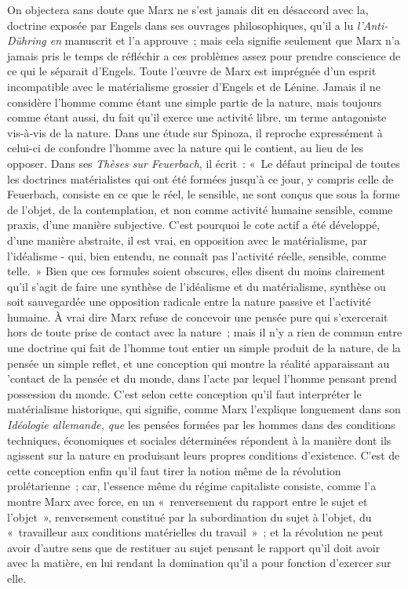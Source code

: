 \documentclass[french,twoside]{book} %
\begin{document}
On objectera sans doute que Marx ne s'est jamais dit en désaccord avec la, doctrine exposée par Engels dans ses ouvrages philosophiques, qu'il a lu {\itshape l'Anti-Dühring en} manuscrit et l'a approuve ; mais cela signifie seulement que Marx n'a jamais pris le temps de réfléchir a ces problèmes assez pour prendre conscience de ce qui le séparait d'Engels. Toute l’œuvre de Marx est imprégnée d'un esprit incompatible avec le matérialisme grossier d'Engels et de Lénine. Jamais il ne considère l'homme comme étant une simple partie de la nature, mais toujours comme étant aussi, du fait qu'il exerce une activité libre, un terme antagoniste vis-à-vis de la nature. Dans une étude sur Spinoza, il reproche expressément à celui-ci de confondre l'homme avec la nature qui le contient, au lieu de les opposer. Dans ses {\itshape Thèses sur Feuerbach}, il écrit : « Le défaut principal de toutes les doctrines matérialistes qui ont été formées jusqu'à ce jour, y compris celle de Feuerbach, consiste en ce que le réel, le sensible, ne sont conçus que sous la forme de l'objet, de la contemplation, et non comme activité humaine sensible, comme praxis, d'une manière subjective. C'est pourquoi le cote actif a été développé, d'une manière abstraite, il est vrai, en opposition avec le matérialisme, par l'idéalisme - qui, bien entendu, ne connaît pas l'activité réelle, sensible, comme telle. » Bien que ces formules soient obscures, elles disent du moins clairement qu'il s'agit de faire une synthèse de l'idéalisme et du matérialisme, synthèse ou soit sauvegardée une opposition radicale entre la nature passive et l'activité humaine. À vrai dire Marx refuse de concevoir une pensée pure qui s'exercerait hors de toute prise de contact avec la nature ; mais il n'y a rien de commun entre une doctrine qui fait de l'homme tout entier un simple produit de la nature, de la pensée un simple reflet, et une conception qui montre la réalité apparaissant au 'contact de la pensée et du monde, dans l'acte par lequel l'homme pensant prend possession du monde. C'est selon cette conception qu'il faut interpréter le matérialisme historique, qui signifie, comme Marx l'explique longuement dans son {\itshape Idéologie allemande, que} les pensées formées par les hommes dans des conditions techniques, économiques et sociales déterminées répondent à la manière dont ils agissent sur la nature en produisant leurs propres conditions d'existence. C'est de cette conception enfin qu'il faut tirer la notion même de la révolution prolétarienne ; car, l'essence même du régime capitaliste consiste, comme l'a montre Marx avec force, en un « renversement du rapport entre le sujet et l'objet », renversement constitué par la subordination du sujet à l'objet, du « travailleur aux conditions matérielles du travail » ; et la révolution ne peut avoir d'autre sens que de restituer au sujet pensant le rapport qu'il doit avoir avec la matière, en lui rendant la domination qu'il a pour fonction d'exercer sur elle.\par
\end{document}
